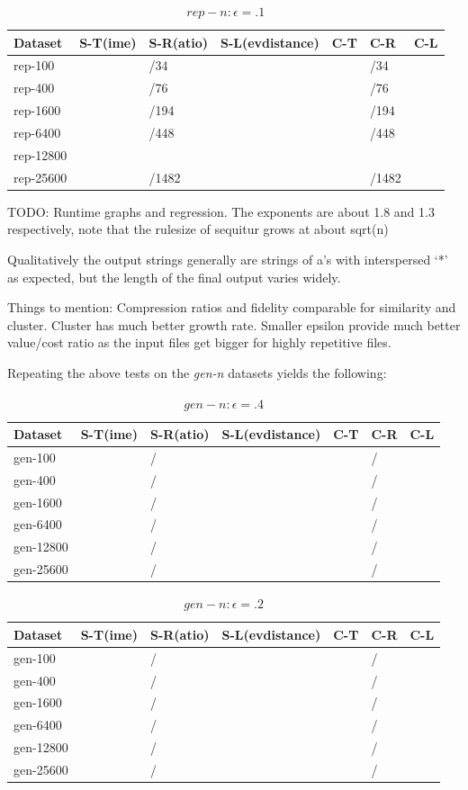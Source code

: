 \documentclass[11pt]{article}
\begin{document}
\begin{table}[h]
\begin{tabular}{l|l|l|l|l|l|l}
Dataset & S-T(ime) & S-R(atio) & S-L(evdistance) & C-T & C-R & C-L \\
\hline
rep-100   & & /34    & & & /34    & \\
rep-400   & & /76    & & & /76    & \\
rep-1600  & & /194  & & & /194  & \\
rep-6400  & & /448  & & & /448  & \\
rep-12800 & & & & & & \\
rep-25600 & & /1482 & & & /1482 & \\
\end{tabular}
\caption{$rep-n: \epsilon = .1$}
\end{table}

TODO: Runtime graphs and regression. The exponents are about 1.8 and 1.3
respectively, note that the rulesize of sequitur grows at about sqrt(n)

Qualitatively the output strings generally are strings of a's with interspersed
`*' as expected, but the length of the final output varies widely.

Things to mention: Compression ratios and fidelity comparable for similarity
and cluster. Cluster has much better growth rate. Smaller epsilon provide
much better value/cost ratio as the input files get bigger for highly
repetitive files.

Repeating the above tests on the \emph{gen-n} datasets yields the following:

\begin{table}[t]
\begin{tabular}{l|l|l|l|l|l|l}
Dataset & S-T(ime) & S-R(atio) & S-L(evdistance) & C-T & C-R & C-L \\
\hline
gen-100   & & /& & & /& \\
gen-400   & & /& & & /& \\
gen-1600  & & /& & & /& \\
gen-6400  & & /& & & /& \\
gen-12800 & & /& & & /& \\
gen-25600 & & /& & & /& \\
\end{tabular}
\caption{$gen-n: \epsilon = .4$}
\end{table}

\begin{table}[t]
\begin{tabular}{l|l|l|l|l|l|l}
Dataset & S-T(ime) & S-R(atio) & S-L(evdistance) & C-T & C-R & C-L \\
\hline
gen-100   & & /& & & /& \\
gen-400   & & /& & & /& \\
gen-1600  & & /& & & /& \\
gen-6400  & & /& & & /& \\
gen-12800 & & /& & & /& \\
gen-25600 & & /& & & /& \\
\end{tabular}
\caption{$gen-n: \epsilon = .2$}
\end{table}
\end{document}
